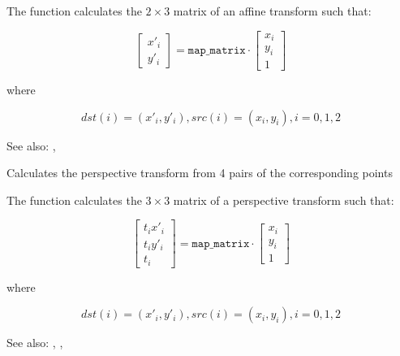 \begin{description}
\end{description}

The function calculates the $2 \times 3$ matrix of an affine transform such that:

\[
\begin{bmatrix}
x'_i\\
y'_i
\end{bmatrix}
=
\texttt{map\_matrix}
\cdot
\begin{bmatrix}
x_i\\
y_i\\
1
\end{bmatrix}
\]

where

\[
dst(i)=(x'_i,y'_i),
src(i)=(x_i, y_i),
i=0,1,2
\]

See also: , 

Calculates the perspective transform from 4 pairs of the corresponding points


\begin{description}
\end{description}

The function calculates the $3 \times 3$ matrix of a perspective transform such that:

\[
\begin{bmatrix}
t_i x'_i\\
t_i y'_i\\
t_i
\end{bmatrix}
=
\texttt{map\_matrix}
\cdot
\begin{bmatrix}
x_i\\
y_i\\
1
\end{bmatrix}
\]

where

\[
dst(i)=(x'_i,y'_i),
src(i)=(x_i, y_i),
i=0,1,2
\]

See also: , , 

